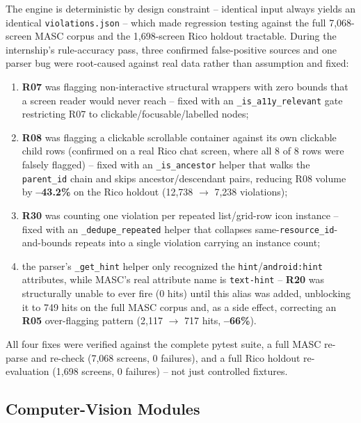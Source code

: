 \documentclass[10pt,conference]{IEEEtran}
\begin{document}
The engine is deterministic by design constraint -- identical input always yields an identical \texttt{violations.json} -- which made regression testing against the full 7{,}068-screen MASC corpus and the 1{,}698-screen Rico holdout tractable. During the internship's rule-accuracy pass, three confirmed false-positive sources and one parser bug were root-caused against real data rather than assumption and fixed:

\begin{enumerate}
    \item \textbf{R07} was flagging non-interactive structural wrappers with zero bounds that a screen reader would never reach -- fixed with an \texttt{\_is\_a11y\_relevant} gate restricting R07 to clickable/focusable/labelled nodes;
    \item \textbf{R08} was flagging a clickable scrollable container against its own clickable child rows (confirmed on a real Rico chat screen, where all 8 of 8 rows were falsely flagged) -- fixed with an \texttt{\_is\_ancestor} helper that walks the \texttt{parent\_id} chain and skips ancestor/descendant pairs, reducing R08 volume by \textbf{--43.2\%} on the Rico holdout (12{,}738 $\rightarrow$ 7{,}238 violations);
    \item \textbf{R30} was counting one violation per repeated list/grid-row icon instance -- fixed with an \texttt{\_dedupe\_repeated} helper that collapses same-\texttt{resource\_id}-and-bounds repeats into a single violation carrying an instance count;
    \item the parser's \texttt{\_get\_hint} helper only recognized the \texttt{hint}/\texttt{android:hint} attributes, while MASC's real attribute name is \texttt{text-hint} -- \textbf{R20} was structurally unable to ever fire (0 hits) until this alias was added, unblocking it to 749 hits on the full MASC corpus and, as a side effect, correcting an \textbf{R05} over-flagging pattern (2{,}117 $\rightarrow$ 717 hits, \textbf{--66\%}).
\end{enumerate}

All four fixes were verified against the complete pytest suite, a full MASC re-parse and re-check (7{,}068 screens, 0 failures), and a full Rico holdout re-evaluation (1{,}698 screens, 0 failures) -- not just controlled fixtures.

\subsection{Computer-Vision Modules}
\end{document}
